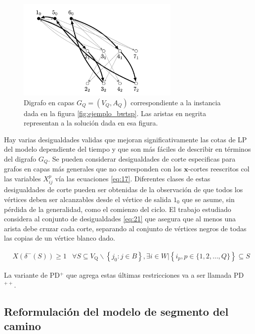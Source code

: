 \documentclass[10pt, a4paper]{article}
\theoremstyle{definition}
\begin{document}
\begin{figure}[H]
  \centering
  \includegraphics[width=0.7\textwidth]{ejemplo_capas_q.png}
  \caption{Digrafo en capas $G_Q = (V_Q,A_Q)$ correspondiente a la instancia dada en la figura \ref{fig:ejemplo_bwtsp}. Las aristas en negrita representan a la solución dada en esa figura.}
  \label{fig:ejemplo_capas_q}
\end{figure}

Hay varias desigualdades validas que mejoran significativamente las cotas de LP del modelo dependiente del tiempo y que son más fáciles de describir en términos del digrafo $G_Q$.
Se pueden considerar desigualdades de corte especificas para grafos en capas más generales que no corresponden con los $\textbf{x}$-cortes reescritos col las variables $X_{ij}^p$ vía las ecuaciones \ref{eq:17}.
Diferentes clases de estas desigualdades de corte pueden ser obtenidas de la observación de que todos los vértices deben ser alcanzables desde el vértice de salida $1_0$ que se asume, sin pérdida de la generalidad, como el comienzo del ciclo. 
El trabajo estudiado considera al conjunto de desigualdades \ref{eq:21} que asegura que al menos una arista debe cruzar cada corte, separando al conjunto de vértices negros de todas las copias de un vértice blanco dado.

\begin{align}
	& X\left(\delta^{-}(S)\right) \geq 1 & \forall S \subseteq V_{\mathrm{Q}} \backslash\left\{j_{0} : j \in B\right\}, \exists i \in W |\left\{i_{p}, p \in\{1,2, \ldots, Q\}\right\} \subseteq S \label{eq:21}
\end{align}

La variante de PD$^+$ que agrega estas últimas restricciones va a ser llamada PD$^{++}$.

\subsection{Reformulación del modelo de segmento del camino}
\end{document}
